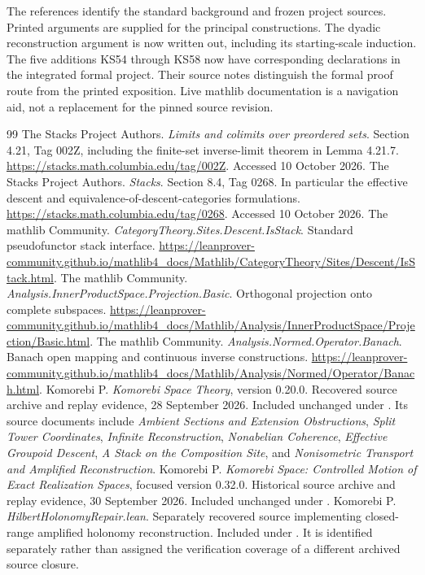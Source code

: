 \clearpage
{}\label{app:references}
The references identify the standard background and frozen project sources. Printed arguments are supplied for the principal constructions. The dyadic reconstruction argument is now written out, including its starting-scale induction. The five additions KS54 through KS58 now have corresponding declarations in the integrated formal project. Their source notes distinguish the formal proof route from the printed exposition. Live mathlib documentation is a navigation aid, not a replacement for the pinned source revision.

\begin{thebibliography}{99}
 The Stacks Project Authors. \emph{Limits and colimits over preordered sets}. Section 4.21, Tag 002Z, including the finite-set inverse-limit theorem in Lemma 4.21.7. \url{https://stacks.math.columbia.edu/tag/002Z}. Accessed 10 October 2026.
 The Stacks Project Authors. \emph{Stacks}. Section 8.4, Tag 0268. In particular the effective descent and equivalence-of-descent-categories formulations. \url{https://stacks.math.columbia.edu/tag/0268}. Accessed 10 October 2026.
 The mathlib Community. \emph{CategoryTheory.Sites.Descent.IsStack}. Standard pseudofunctor stack interface. \url{https://leanprover-community.github.io/mathlib4_docs/Mathlib/CategoryTheory/Sites/Descent/IsStack.html}.
 The mathlib Community. \emph{Analysis.InnerProductSpace.Projection.Basic}. Orthogonal projection onto complete subspaces. \url{https://leanprover-community.github.io/mathlib4_docs/Mathlib/Analysis/InnerProductSpace/Projection/Basic.html}.
 The mathlib Community. \emph{Analysis.Normed.Operator.Banach}. Banach open mapping and continuous inverse constructions. \url{https://leanprover-community.github.io/mathlib4_docs/Mathlib/Analysis/Normed/Operator/Banach.html}.
 Komorebi P. \emph{Komorebi Space Theory}, version 0.20.0. Recovered source archive and replay evidence, 28 September 2026. Included unchanged under . Its source documents include \emph{Ambient Sections and Extension Obstructions}, \emph{Split Tower Coordinates}, \emph{Infinite Reconstruction}, \emph{Nonabelian Coherence}, \emph{Effective Groupoid Descent}, \emph{A Stack on the Composition Site}, and \emph{Nonisometric Transport and Amplified Reconstruction}.
 Komorebi P. \emph{Komorebi Space: Controlled Motion of Exact Realization Spaces}, focused version 0.32.0. Historical source archive and replay evidence, 30 September 2026. Included unchanged under .
 Komorebi P. \emph{HilbertHolonomyRepair.lean}. Separately recovered source implementing closed-range amplified holonomy reconstruction. Included under . It is identified separately rather than assigned the verification coverage of a different archived source closure.
\end{thebibliography}

